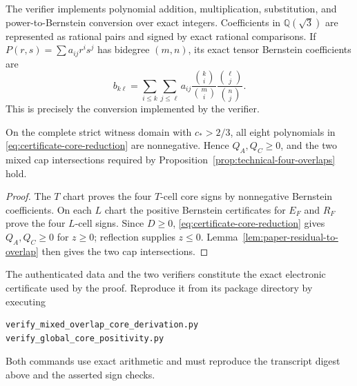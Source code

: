 The verifier implements polynomial addition, multiplication, substitution,
and power-to-Bernstein conversion over exact integers.  Coefficients in
$\mathbb Q(\sqrt3)$ are represented as rational pairs and signed by exact
rational comparisons.  If
$P(r,s)=\sum a_{ij}r^is^j$ has bidegree $(m,n)$, its exact tensor Bernstein
coefficients are
\[
 b_{k\ell}
 =\sum_{i\le k}\sum_{j\le\ell}
 a_{ij}\frac{\binom{k}{i}}{\binom{m}{i}}
       \frac{\binom{\ell}{j}}{\binom{n}{j}}.
\]
This is precisely the conversion implemented by the verifier.

\begin{theorem}
\label{thm:paper-exact-mixed-certificate}
On the complete strict witness domain with $c_*>2/3$, all eight polynomials in
\eqref{eq:certificate-core-reduction} are nonnegative.  Hence
$Q_A,Q_C\ge0$, and the two mixed cap intersections required by
Proposition~\ref{prop:technical-four-overlaps} hold.
\end{theorem}

\begin{proof}
The $T$ chart proves the four $T$-cell core signs by nonnegative Bernstein
coefficients.  On each $L$ chart the positive Bernstein certificates for
$E_F$ and $R_F$ prove the four $L$-cell signs.  Since $D\ge0$,
\eqref{eq:certificate-core-reduction} gives $Q_A,Q_C\ge0$ for $z\ge0$;
reflection supplies $z\le0$.  Lemma~\ref{lem:paper-residual-to-overlap} then
gives the two cap intersections.
\end{proof}

\begin{remark}[Reproduction]
The authenticated data and the two verifiers constitute the exact electronic
certificate used by the proof. Reproduce it from its package directory by
executing
\begin{verbatim}
verify_mixed_overlap_core_derivation.py
verify_global_core_positivity.py
\end{verbatim}
Both commands use exact arithmetic and must reproduce the transcript digest
above and the asserted sign checks.
\end{remark}

